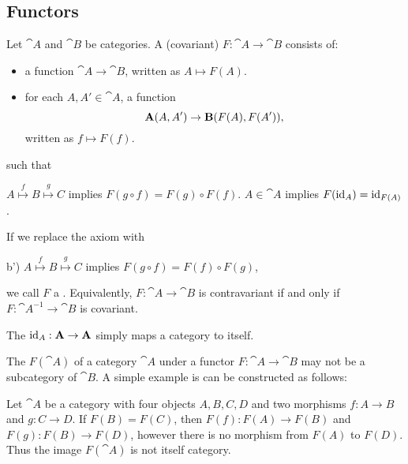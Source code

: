 \subsection{Functors}\label{subsec:functors}

\begin{definition}\label{def:functor}\mcite\cite[def. 1.2.1 \\ def. 1.2.10]{Leinster2016Basic}
  Let \( \cat{A} \) and \( \cat{B} \) be categories. A (covariant)  \( F: \cat{A} \to \cat{B} \) consists of:
  \begin{itemize}
    \item a function \( \cat{A} \to \cat{B} \), written as \( A \mapsto F(A) \).
    \item for each \( A, A' \in \cat{A} \), a function
          \begin{equation*}
            \operatorname{\mathbf{A}}(A, A') \to \operatorname{\mathbf{B}}(F(A), F(A')),
          \end{equation*}
          written as \( f \mapsto F(f) \).
  \end{itemize}
  such that
  \begin{thmenum}
     \( A \overset f \mapsto B \overset g \mapsto C \) implies \( F(g \circ f) = F(g) \circ F(f) \).
     \( A \in \cat{A} \) implies \( F(\operatorname{id}_A) = \operatorname{id}_{F(A)} \).
  \end{thmenum}

  If we replace the axiom  with
  \begin{thmenum}
    \item[b')]\label{def:functor/contravariant_composition_axiom} \( A \overset f \mapsto B \overset g \mapsto C \) implies \( F(g \circ f) = F(f) \circ F(g) \),
  \end{thmenum}
  we call \( F \) a . Equivalently, \( F: \cat{A} \to \cat{B} \) is contravariant if and only if \( F: \cat{A}^{-1} \to \cat{B} \) is covariant.

  The  \( \operatorname{id}_A: \operatorname{\mathbf{A}} \to \operatorname{\mathbf{A}} \) simply maps a category to itself.
\end{definition}

\begin{remark}\label{rem:image_of_functor_maybe_not_subcategory}
  The  \( F(\cat{A}) \) of a category \( \cat{A} \) under a functor \( F: \cat{A} \to \cat{B} \) may not be a subcategory of \( \cat{B} \). A simple example is can be constructed as follows:

  Let \( \cat{A} \) be a category with four objects \( A, B, C, D \) and two morphisms \( f: A \to B \) and \( g: C \to D \). If \( F(B) = F(C) \), then \( F(f): F(A) \to F(B) \) and \( F(g): F(B) \to F(D) \), however there is no morphism from \( F(A) \) to \( F(D) \). Thus the image \( F(\cat{A}) \) is not itself category.
\end{remark}

